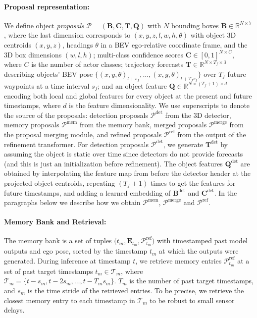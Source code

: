 \paragraph{Proposal representation:}  
We define object \textit{proposals}
$\mathcal{P} = (\mathbf{B}, \mathbf{C}, \mathbf{T}, \mathbf{Q})$ with
$N$ bounding boxes $\mathbf{B} \in \mathbb{R}^{N \times 7}$,
where the last dimension corresponds to $(x, y, z, l, w, h, \theta)$ with
object 3D centroids $(x, y, z)$,
headings $\theta$ in a BEV ego-relative coordinate frame,
and the 3D box dimensions $(w, l, h)$;
multi-class confidence scores $\mathbf{C} \in [0, 1]^{N \times C}$,
where $C$ is the number of actor classes;
trajectory forecasts $\mathbf{T} \in \mathbb{R}^{N \times T_f \times 3}$ describing objects' BEV pose
$\{(x, y, \theta)_{t+s_f}, \dots, (x, y, \theta)_{t + T_f s_f}\}$
over $T_f$ future waypoints at a time interval $s_f$;
and an object feature $\mathbf{Q} \in \mathbb{R}^{N \times (T_f + 1) \times d}$ encoding both local and global features for every object at the present and future timestamps,
where $d$ is the feature dimensionality.
We use superscripts to denote the source of the proposals:
detection proposals $\mathcal{P}^\mathrm{det}$ from the 3D detector,
memory proposals $\mathcal{P}^\mathrm{mem}$ from the memory bank,
merged proposals $\mathcal{P}^\mathrm{merge}$ from the proposal merging module,
and refined proposals $\mathcal{P}^\mathrm{ref}$ from the output of the refinement transformer.
For detection proposals $\mathcal{P}^{\mathrm{det}}$,
we generate $\mathbf{T}^\mathrm{det}$
by assuming the object is static over time since detectors do not provide forecasts (and this is just an initialization before refinement). The object features $\mathbf{Q}^\mathrm{det}$ are obtained by interpolating the feature map from before the detector header at the projected object centroids,
repeating $(T_f + 1)$ times to get the features for future timestamps, and adding a learned embedding of $\mathbf{B}^\mathrm{det}$ and $\mathbf{C}^\mathrm{det}$.
In the paragraphs below we describe how we obtain $\mathcal{P}^\mathrm{mem}$, $\mathcal{P}^\mathrm{merge}$ and $\mathcal{P}^\mathrm{ref}$.

\paragraph{Memory Bank and Retrieval:}
The memory bank is a set of tuples $\big(t_m, \mathbf{E}_{t_m}, \mathcal{P}^{\mathrm{ref}}_{t_m} \big)$
with timestamped past model outputs and ego pose, sorted by the timestamp $t_m$ at which the outputs were generated.
During inference at timestamp $t$, we retrieve memory entries
$\mathcal{P}_{t_m}^\mathrm{ref}$
at a set of past target timestamps $t_m \in \mathcal{T}_m$, where $\mathcal{T}_m = \{t- s_m, t-2 s_m, \dots, t-T_m s_m\}$.
$T_m$ is the number of past target timestamps, and $s_m$ is the time stride of the retrieved entries. To be precise, we retrieve the closest memory entry to each timestamp in $\mathcal{T}_m$ to be robust to small sensor delays.

